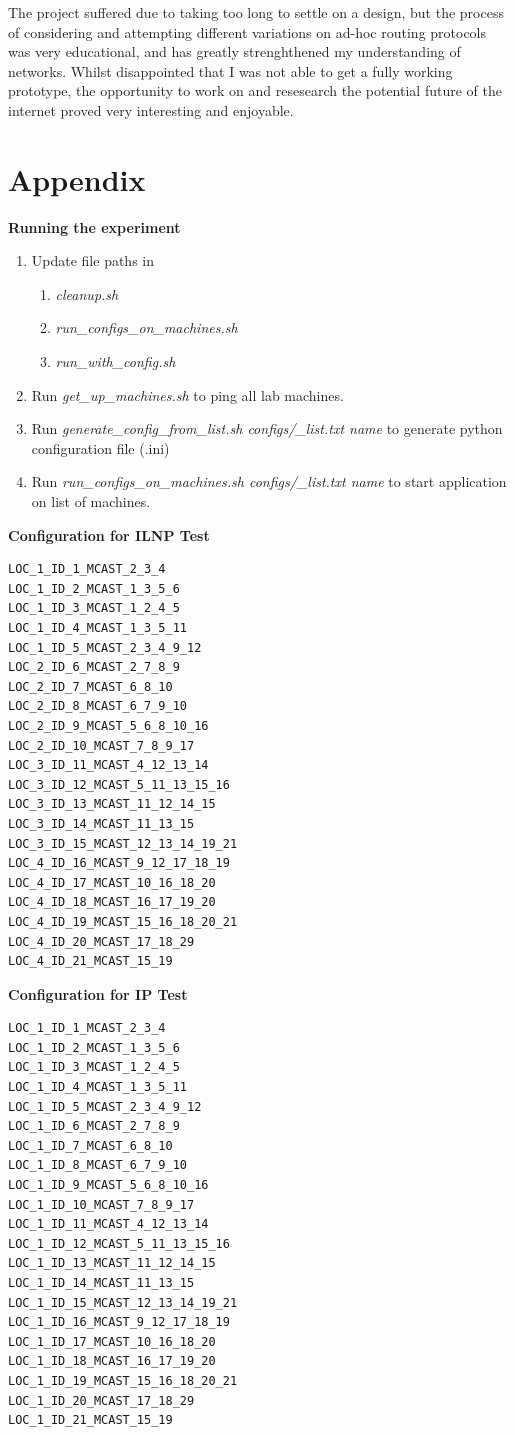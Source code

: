 \documentclass[12pt]{article}
\begin{document}
The project suffered due to taking too long to settle on a design, but the process of considering and attempting different variations on ad-hoc routing protocols was very educational, and has greatly strenghthened my understanding of networks. Whilst disappointed that I was not able to get a fully working prototype, the opportunity to work on and resesearch the potential future of the internet proved very interesting and enjoyable.

\pagebreak
\section{Appendix}

\textbf{Running the experiment}
\begin{enumerate}
	\item Update file paths in 
	\begin{enumerate}
		\item \emph{cleanup.sh}
		\item \emph{run\_configs\_on\_machines.sh}
		\item \emph{run\_with\_config.sh}
	\end{enumerate}
	\item Run \emph{get\_up\_machines.sh} to ping all lab machines.
	\item Run \emph{generate\_config\_from\_list.sh configs/\_list.txt name} to generate python configuration file (.ini)
	\item Run \emph{run\_configs\_on\_machines.sh configs/\_list.txt name} to start application on list of machines.

\end{enumerate}

\noindent\textbf{Configuration for ILNP Test}

\begin{lstlisting}
LOC_1_ID_1_MCAST_2_3_4
LOC_1_ID_2_MCAST_1_3_5_6
LOC_1_ID_3_MCAST_1_2_4_5
LOC_1_ID_4_MCAST_1_3_5_11
LOC_1_ID_5_MCAST_2_3_4_9_12
LOC_2_ID_6_MCAST_2_7_8_9
LOC_2_ID_7_MCAST_6_8_10
LOC_2_ID_8_MCAST_6_7_9_10
LOC_2_ID_9_MCAST_5_6_8_10_16
LOC_2_ID_10_MCAST_7_8_9_17
LOC_3_ID_11_MCAST_4_12_13_14
LOC_3_ID_12_MCAST_5_11_13_15_16
LOC_3_ID_13_MCAST_11_12_14_15
LOC_3_ID_14_MCAST_11_13_15
LOC_3_ID_15_MCAST_12_13_14_19_21
LOC_4_ID_16_MCAST_9_12_17_18_19
LOC_4_ID_17_MCAST_10_16_18_20
LOC_4_ID_18_MCAST_16_17_19_20
LOC_4_ID_19_MCAST_15_16_18_20_21
LOC_4_ID_20_MCAST_17_18_29
LOC_4_ID_21_MCAST_15_19
\end{lstlisting}

\noindent\textbf{Configuration for IP Test}
\begin{lstlisting}
LOC_1_ID_1_MCAST_2_3_4
LOC_1_ID_2_MCAST_1_3_5_6
LOC_1_ID_3_MCAST_1_2_4_5
LOC_1_ID_4_MCAST_1_3_5_11
LOC_1_ID_5_MCAST_2_3_4_9_12
LOC_1_ID_6_MCAST_2_7_8_9
LOC_1_ID_7_MCAST_6_8_10
LOC_1_ID_8_MCAST_6_7_9_10
LOC_1_ID_9_MCAST_5_6_8_10_16
LOC_1_ID_10_MCAST_7_8_9_17
LOC_1_ID_11_MCAST_4_12_13_14
LOC_1_ID_12_MCAST_5_11_13_15_16
LOC_1_ID_13_MCAST_11_12_14_15
LOC_1_ID_14_MCAST_11_13_15
LOC_1_ID_15_MCAST_12_13_14_19_21
LOC_1_ID_16_MCAST_9_12_17_18_19
LOC_1_ID_17_MCAST_10_16_18_20
LOC_1_ID_18_MCAST_16_17_19_20
LOC_1_ID_19_MCAST_15_16_18_20_21
LOC_1_ID_20_MCAST_17_18_29
LOC_1_ID_21_MCAST_15_19
\end{lstlisting}



\end{document}

